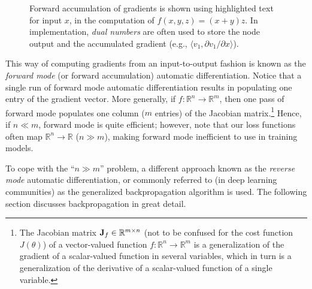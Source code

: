 \begin{figure}[!t]
\centering
{}
\caption{Forward accumulation of gradients is shown using \colorbox{gray!30}{highlighted} text for input $x$, in the computation of $f(x, y, z) = (x + y)z$. In implementation, \textit{dual numbers} are often used to store the node output and the accumulated gradient (e.g., $\langle v_1, \partial v_1 / \partial x\rangle$).}
\label{fig:2}
\end{figure}

This way of computing gradients from an input-to-output fashion is known as the \textit{forward mode} (or forward accumulation) automatic differentiation. Notice that a single run of forward mode automatic differentiation results in populating one entry of the gradient vector. More generally, if $f: \mathbb{R}^n \rightarrow \mathbb{R}^m$, then one pass of forward mode populates one column ($m$ entries) of the Jacobian matrix.\footnote{The Jacobian matrix $\mathbf{J}_f \in \mathbb{R}^{m \times n}$ (not to be confused for the cost function $J(\theta)$) of a vector-valued function $f: \mathbb{R}^n \rightarrow \mathbb{R}^m$ is a generalization of the gradient of a scalar-valued function in several variables, which in turn is a generalization of the derivative of a scalar-valued function of a single variable.} Hence, if $n \ll m$, forward mode is quite efficient; however, note that our loss functions often map $\mathbb{R}^n \rightarrow \mathbb{R}$ ($n \gg m$), making forward mode inefficient to use in training models.

To cope with the ``$n \gg m$'' problem, a different approach known as the \textit{reverse mode} automatic differentiation, or commonly referred to (in deep learning communities) as the generalized backpropagation algorithm is used. The following section discusses backpropagation in great detail.
